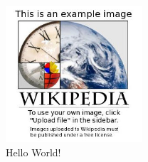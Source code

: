 \begin{figure}
\includegraphics[width=2in]{img/Example.jpg}
\caption{Hello World!}
\label{fig:example}
\end{figure}
